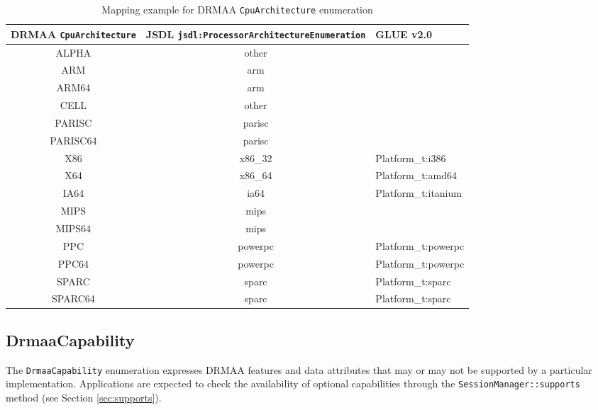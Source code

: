\documentclass{article}
\newcommand{\h}[1]{\lstinline|#1|}
\newcommand{\rat}[1]{}
\begin{document}
\rat{This kind of reporting is the only one that makes sense from the application point of view. The Nov 30th 2011 conf call clarified that CPU speed is intentionally left out in DRMAAv2.}

\begin{table}[ht]
\centering
\begin{tabularx}{\textwidth}{|c|c|X|}
\hline
DRMAA \h{CpuArchitecture} & JSDL \h{jsdl:ProcessorArchitectureEnumeration} & GLUE v2.0 \\
\hline
ALPHA		&	other & \\
ARM			&	arm & \\
ARM64		&	arm & \\
CELL		&	other & \\
PARISC		&	parisc & \\
PARISC64	&	parisc & \\
X86			&	x86\_32 & Platform\_t:i386 \\
X64			&	x86\_64 & Platform\_t:amd64 \\
IA64		&	ia64 & Platform\_t:itanium \\
MIPS		&	mips & \\
MIPS64		&	mips & \\
PPC			&	powerpc & Platform\_t:powerpc \\
PPC64		&	powerpc & Platform\_t:powerpc \\
SPARC		&	sparc & Platform\_t:sparc \\
SPARC64		&	sparc & Platform\_t:sparc \\
\hline
\end{tabularx}
\caption{Mapping example for DRMAA \h{CpuArchitecture} enumeration}
\label{tab:cpumappings}
\end{table}

\subsection{DrmaaCapability}
\label{sec:drmaacapability}

The \h{DrmaaCapability} enumeration expresses DRMAA features and data attributes that may or may not be supported by a particular implementation. Applications are expected to check the availability of optional capabilities through the \h{SessionManager::supports} method (see Section \ref{sec:supports}).


\end{document}
